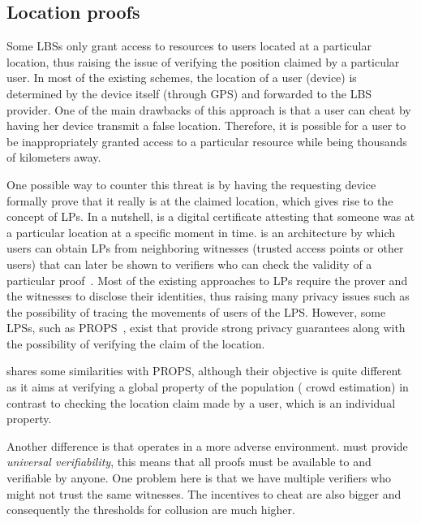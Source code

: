 \subsection{Location proofs}

Some \acp{LBS} only grant access to resources to users located at a particular 
location, thus raising the issue of verifying the position claimed by a 
particular user.
In most of the existing schemes, the location of a user (device) is determined 
by the device itself (\eg through GPS) and forwarded to the \ac{LBS} provider.
One of the main drawbacks of this approach is that a user can cheat by having 
her device transmit a false location.
Therefore, it is possible for a user to be inappropriately granted access to a 
particular resource while being thousands of kilometers away.

One possible way to counter this threat is by having the requesting device 
formally prove that it really is at the claimed location, which gives rise to 
the concept of \acp{LP}.
In a nutshell,  is a digital certificate attesting that someone was at 
a particular location at a specific moment in time.
 is an architecture by which users can obtain \acp{LP} from 
neighboring witnesses (\eg trusted access points or other users) that can later 
be shown to verifiers who can check the validity of a particular 
proof~\cite{luo2010veriplace,zhu2011applaus}.
Most of the existing approaches to \acp{LP} require the prover and the 
witnesses to disclose their identities, thus raising many privacy issues such 
as the possibility of tracing the movements of users of the \ac{LPS}.
However, some \acp{LPS}, such as PROPS~\cite{PROPS}, exist that provide strong 
privacy guarantees along with the possibility of verifying the claim of the 
location.

\CROCUS shares some similarities with PROPS, although their objective is quite 
different as it aims at verifying a global property of the population (\ie 
crowd estimation) in contrast to checking the location claim made by a user, 
which is an individual property.

Another difference is that \CROCUS operates in a more adverse environment.
\CROCUS must provide \emph{universal verifiability}, this means that all proofs 
must be available to and verifiable by anyone.
One problem here is that we have multiple verifiers who might not trust the 
same witnesses.
The incentives to cheat are also bigger and consequently the thresholds for 
collusion are much higher.

